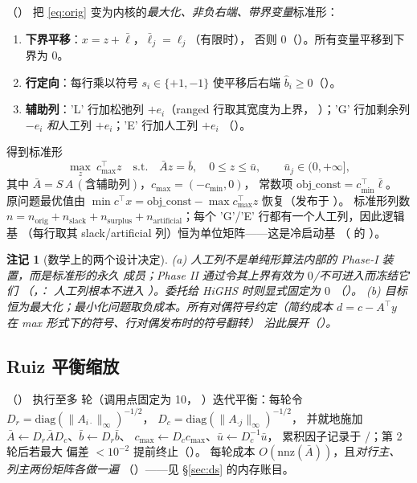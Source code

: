 \documentclass[11pt]{ctexart}
\newtheorem{remark}{注记}
\newcommand{\nnz}{\mathrm{nnz}}
\begin{document}
（）
把 \eqref{eq:orig} 变为内核的\emph{最大化、非负右端、带界变量}标准形：
\begin{enumerate}[label=(\roman*),leftmargin=2em]
\item \textbf{下界平移}：$x = z + \bar\ell$，$\bar\ell_j = \ell_j$（有限时），
否则 $0$（）。所有变量平移到下界为 $0$。
\item \textbf{行定向}：每行乘以符号 $s_i\in\{+1,-1\}$ 使平移后右端
$\hat b_i \ge 0$（）。
\item \textbf{辅助列}：'L' 行加松弛列 $+e_i$（ranged 行取其宽度为上界，
）；'G' 行加剩余列 $-e_i$
\emph{和}人工列 $+e_i$；'E' 行加人工列 $+e_i$
（）。
\end{enumerate}
得到标准形
\begin{equation}
\max_{z}\ c_{\max}^{\top} z \quad
\text{s.t.}\quad \bar A z = \bar b,\quad 0 \le z \le \bar u,
\qquad \bar u_j \in (0,+\infty],
\label{eq:sf}
\end{equation}
其中 $\bar A = S\,A\,(\text{含辅助列})$，$c_{\max}=(-c_{\min},0)$，
常数项 $\mathrm{obj\_const} = c_{\min}^{\top}\bar\ell$。
原问题最优值由 $\min c^{\top}x = \mathrm{obj\_const} - \max c_{\max}^{\top}z$
恢复（发布于 ）。
标准形列数 $n = n_{\mathrm{orig}} + n_{\mathrm{slack}} + n_{\mathrm{surplus}}
+ n_{\mathrm{artificial}}$；每个 'G'/'E' 行都有一个人工列，因此逻辑基
（每行取其 slack/artificial 列）恒为单位矩阵——这是冷启动基
（ 的 ）。

\begin{remark}[数学上的两个设计决定]
(a) 人工列不是单纯形算法内部的 Phase-I 装置，而是\emph{标准形的永久
成员}；Phase II 通过令其上界有效为 $0$/不可进入而冻结它们
（，：
人工列根本不进入 ）。委托给 HiGHS 时则显式固定为 $0$
（）。
(b) 目标恒为最大化；最小化问题取负成本。所有对偶符号约定（简约成本
$d = c - A^{\top}y$ 在 max 形式下的符号、行对偶发布时的符号翻转）
沿此展开（）。
\end{remark}

\subsection{Ruiz 平衡缩放}
（）
执行至多  轮（调用点固定为 10，
）迭代平衡：每轮令
$D_r = \mathrm{diag}(\|A_{i\cdot}\|_\infty)^{-1/2}$，
$D_c = \mathrm{diag}(\|A_{\cdot j}\|_\infty)^{-1/2}$，
并就地施加 $\bar A \leftarrow D_r \bar A D_c$、$\bar b \leftarrow D_r\bar b$、
$c_{\max}\leftarrow D_c c_{\max}$、$\bar u \leftarrow D_c^{-1}\bar u$，
累积因子记录于 /；第 2 轮后若最大
偏差 $<10^{-2}$ 提前终止（）。
每轮成本 $O(\nnz(\bar A))$，且\emph{对行主、列主两份矩阵各做一遍}
（）——见 \S\ref{sec:ds} 的内存账目。
\end{document}
